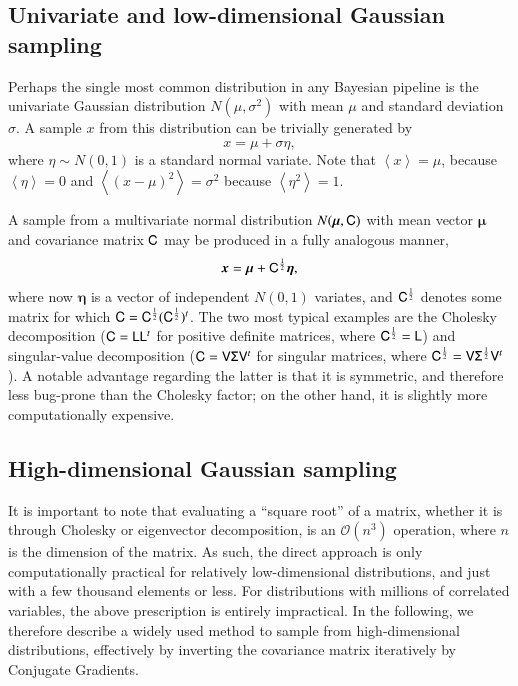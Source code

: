 \documentclass[onecolumn]{aa}
\newcommand{\V}[0]{\tens{V}}
\newcommand{\x}[0]{\vec{x}}
\renewcommand{\L}[0]{\tens{L}}
\renewcommand{\C}[0]{\tens{C}}
\begin{document}
\subsection{Univariate and low-dimensional Gaussian sampling}
\label{sec:gauss_lowdim}

Perhaps the single most common distribution in any Bayesian pipeline
is the univariate Gaussian distribution $N(\mu,\sigma^2)$ with mean
$\mu$ and standard deviation $\sigma$. A sample $x$ from this
distribution can be trivially generated by
\begin{equation}
  x = \mu + \sigma \eta,
\end{equation}
where $\eta\sim N(0,1)$ is a standard normal variate. Note that
$\left<x\right> = \mu$, because $\left<\eta\right> = 0$ and
$\left<(x-\mu)^2\right> = \sigma^2$ because $\left<\eta^2\right> = 1$.

A sample from a multivariate normal distribution $N(\boldsymbol{\mu}, \C)$
with mean vector $\boldsymbol{\mu}$ and covariance matrix $\C$ may be
produced in a fully analogous manner,
\begin{equation}
  \x = \boldsymbol{\mu} + \C^{\frac{1}{2}} \boldsymbol{\eta},
\end{equation}
where now $\boldsymbol{\eta}$ is a vector of independent $N(0,1)$ variates,
and $\C^{\frac{1}{2}}$ denotes some matrix for which $\C =
\C^{\frac{1}{2}}(\C^{\frac{1}{2}})^t$. The two most typical examples
are the Cholesky decomposition ($\C = \L\L^t$ for positive definite
matrices, where $\C^{\frac{1}{2}} = \L$) and singular-value
decomposition ($\C = \V\tens\Sigma\V^t$ for singular matrices, where
$\C^{\frac{1}{2}} = \V\tens\Sigma^{\frac{1}{2}}\V^t$). A notable advantage
regarding the latter is that it is symmetric, and therefore less
bug-prone than the Cholesky factor; on the other hand, it is slightly
more computationally expensive.

\subsection{High-dimensional Gaussian sampling}
\label{sec:gauss_highdim}

It is important to note that evaluating a ``square root'' of a matrix,
whether it is through Cholesky or eigenvector decomposition, is an
$\mathcal{O}(n^3)$ operation, where $n$ is the dimension of the
matrix. As such, the direct approach is only computationally
practical for relatively low-dimensional distributions, and just with
a few thousand elements or less. For distributions with millions of
correlated variables, the above prescription is entirely
impractical. In the following, we therefore describe a widely used
method to sample from high-dimensional distributions, effectively by
inverting the covariance matrix iteratively by Conjugate Gradients.
\end{document}
